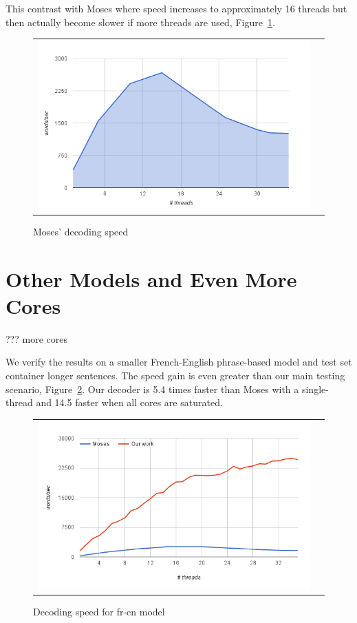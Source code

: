 \documentclass[11pt]{article}
\begin{document}
This contrast with Moses where speed increases to approximately 16 threads but then actually become slower if more threads are used, Figure~\ref{fig:moses-speed}.
\begin{figure}[h]
\centering
\begin{tabular}{cc}
{\includegraphics[scale=0.4]{moses-scalability.png}} 
\end{tabular}
\caption{Moses' decoding speed}
\label{fig:moses-speed}
\end{figure} 


\section{Other Models and Even More Cores}

??? more cores

We verify the results on a smaller French-English phrase-based model and test set container longer sentences. The speed gain is even greater than our main testing scenario, Figure~\ref{fig:fr-en-speed}. Our decoder is 5.4 times faster than Moses with a single-thread and 14.5 faster when all cores are saturated.
\begin{figure}[h]
\centering
\begin{tabular}{cc}
{\includegraphics[scale=0.4]{fr-en-speed.png}} 
\end{tabular}
\caption{Decoding speed for fr-en model}
\label{fig:fr-en-speed}
\end{figure} 
\end{document}
